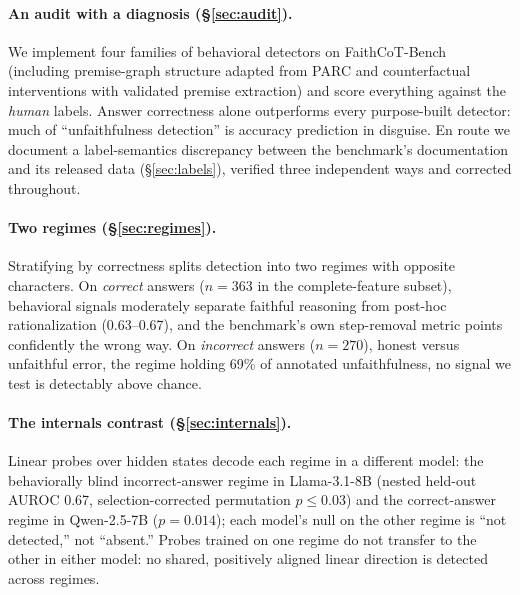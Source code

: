 \documentclass[11pt]{article}
\begin{document}
\paragraph{An audit with a diagnosis (\S\ref{sec:audit}).} We implement four families of behavioral detectors on FaithCoT-Bench (including premise-graph structure adapted from PARC \citep{mukherjee2025parc} and counterfactual interventions with validated premise extraction) and score everything against the \emph{human} labels. Answer correctness alone outperforms every purpose-built detector: much of ``unfaithfulness detection'' is accuracy prediction in disguise. En route we document a label-semantics discrepancy between the benchmark's documentation and its released data (\S\ref{sec:labels}), verified three independent ways and corrected throughout.

\paragraph{Two regimes (\S\ref{sec:regimes}).} Stratifying by correctness splits detection into two regimes with opposite characters. On \emph{correct} answers ($n{=}363$ in the complete-feature subset), behavioral signals moderately separate faithful reasoning from post-hoc rationalization (0.63--0.67), and the benchmark's own step-removal metric points confidently the wrong way. On \emph{incorrect} answers ($n{=}270$), honest versus unfaithful error, the regime holding 69\% of annotated unfaithfulness, no signal we test is detectably above chance.

\paragraph{The internals contrast (\S\ref{sec:internals}).} Linear probes over hidden states decode each regime in a different model: the behaviorally blind incorrect-answer regime in Llama-3.1-8B (nested held-out AUROC 0.67, selection-corrected permutation $p{\leq}0.03$) and the correct-answer regime in Qwen-2.5-7B ($p{=}0.014$); each model's null on the other regime is ``not detected,'' not ``absent.'' Probes trained on one regime do not transfer to the other in either model: no shared, positively aligned linear direction is detected across regimes.
\end{document}
